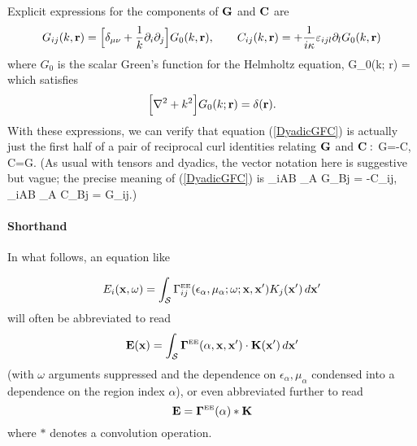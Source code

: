 \documentclass[dvips,letterpaper]{article}
\newcommand{\BG}{\boldsymbol{\Gamma}}
\begin{document}
Explicit expressions for the components of $\mathbf{G}$ and $\mathbf{C}$ are 
\begin{equation}
G_{ij}(k,\mathbf{r}) =
  \Big[\delta_{\mu\nu} +\frac{1}{k} \partial_i \partial_j \Big]
  G_0(k, \mathbf{r}), \qquad
  C_{ij}(k, \mathbf{r}) = +\frac{1}{i\kappa} \varepsilon_{ijl} 
                          \partial_l G_0(k, \mathbf{r})
\label{GCfromG0}
\end{equation}
where $G_0$ is the scalar Green's function for the Helmholtz equation,
{G_0(k; \vb r)
   =
}
which satisfies
$$ \Big[ \nabla^2 + k^2 \Big] G_0(k; \mathbf{r})
   =\delta(\mathbf{r}).
$$
With these expressions, we can verify that equation (\ref{DyadicGFC}) 
is actually just the first half of a pair of reciprocal curl identities 
relating $\mathbf{G}$ and $\mathbf{C}:$
{
   \nabla \times \vb G=-\vb C, 
\qquad
   \nabla \times \vb C=\vb G.
}
(As usual with tensors and dyadics, the vector notation here
is suggestive but vague; the precise meaning of (\ref{DyadicGFC}) is 
{
    \varepsilon_{iAB} \partial_A G_{Bj} = -C_{ij},
   \qquad
    \varepsilon_{iAB} \partial_A C_{Bj} = G_{ij}.)
}



\paragraph{Shorthand} In what follows, an equation like 

$$ E_i(\mathbf{x}, \omega) = 
   \int_{\mathcal S} 
     \Gamma^{\hbox{\tiny{EE}}}_{ij}(\epsilon_\alpha, \mu_\alpha; \omega; 
                          \mathbf{x}, \mathbf{x}^\prime) 
     K_j(\mathbf{x}^\prime)
    \, d\mathbf{x}^\prime
$$
will often be abbreviated to read 
$$ \vb E(\vb x) = 
    \int_{\mathcal S} 
      \BG\supt{EE}(\alpha, \vb x, \vb x^\prime) 
         \cdot \vb K(\vb x^\prime) 
    \, d\vb x^\prime
$$
(with $\omega$ arguments suppressed and the dependence 
on $\epsilon_\alpha, \mu_\alpha$ condensed into a dependence
on the region index $\alpha$), or even abbreviated further
to read
$$ \vb E = \BG\supt{EE}(\alpha) * \vb K $$
where $*$ denotes a convolution operation.

\newpage
\end{document}
